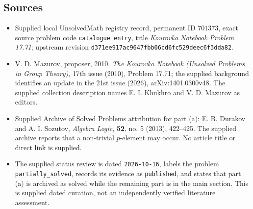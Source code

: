 \documentclass[11pt]{article}
\begin{document}
\subsection{Sources}
\begin{itemize}
\item Supplied local UnsolvedMath registry record, permanent ID \(701373\), exact source problem code \texttt{catalogue entry}, title \emph{Kourovka Notebook Problem 17.71}; upstream revision \texttt{d371ee917ac9647fbb06cd6fc529deec6f3dda82}.
\item V. D. Mazurov, proposer, 2010. \emph{The Kourovka Notebook (Unsolved Problems in Group Theory)}, 17th issue (2010), Problem 17.71; the supplied background identifies an update in the 21st issue (2026), arXiv:1401.0300v48. The supplied collection description names E. I. Khukhro and V. D. Mazurov as editors.
\item Supplied Archive of Solved Problems attribution for part (a): E. B. Durakov and A. I. Sozutov, \emph{Algebra Logic}, \textbf{52}, no. 5 (2013), 422--425. The supplied archive reports that a non-trivial \(p\)-element may occur. No article title or direct link is supplied.
\item The supplied status review is dated \texttt{2026-10-16}, labels the problem \texttt{partially\_solved}, records its evidence as \texttt{published}, and states that part (a) is archived as solved while the remaining part is in the main section. This is supplied dated curation, not an independently verified literature assessment.
\end{itemize}
\end{document}
